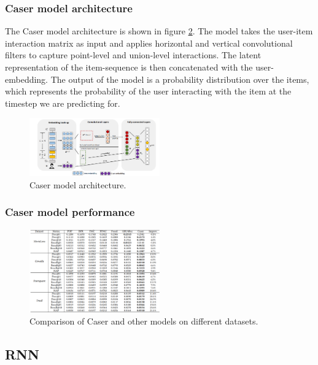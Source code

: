 \documentclass{ieeetj}
\begin{document}
\subsubsection{Caser model architecture}
\label{sec: caser-architecture}

The Caser model architecture is shown in figure \ref{fig:caser-architecture}. The model takes the user-item interaction matrix as input and applies horizontal and vertical convolutional filters to capture point-level and union-level interactions. The latent representation of the item-sequence is then concatenated with the user-embedding. The output of the model is a probability distribution over the items, which represents the probability of the user interacting with the item at the timestep we are predicting for.
\begin{figure}[h]
\centering
\includegraphics[width=0.5\textwidth]{figures/caser-architecture.png}
\caption{Caser model architecture.}
\label{fig:caser-architecture}
\end{figure}

\subsubsection{Caser model performance}
\begin{figure}[h]
	\centering
	\includegraphics[width=0.5\textwidth]{figures/caser-performance.png}
	\caption{Comparison of Caser and other models on different datasets.}
	\label{fig:caser-architecture}
\end{figure}
\FloatBarrier

\subsection{RNN}
\end{document}
